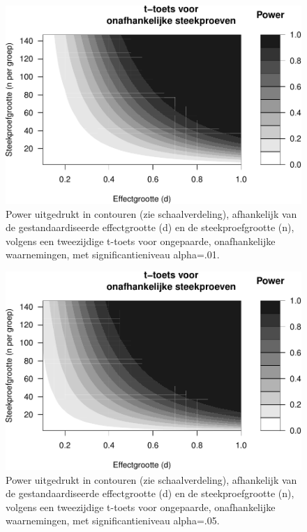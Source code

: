 \documentclass[
]{book}
\begin{document}
\begin{figure}
\centering
\includegraphics{KMS-NL_files/figure-latex/powercontours-alpha01-1.pdf}
\caption{\label{fig:powercontours-alpha01}Power uitgedrukt in contouren (zie schaalverdeling), afhankelijk van de gestandaardiseerde effectgrootte (d) en de steekproefgrootte (n), volgens een tweezijdige t-toets voor ongepaarde, onafhankelijke waarnemingen, met significantieniveau alpha=.01.}
\end{figure}

\begin{figure}
\centering
\includegraphics{KMS-NL_files/figure-latex/powercontours-alpha05-1.pdf}
\caption{\label{fig:powercontours-alpha05}Power uitgedrukt in contouren (zie schaalverdeling), afhankelijk van de gestandaardiseerde effectgrootte (d) en de steekproefgrootte (n), volgens een tweezijdige t-toets voor ongepaarde, onafhankelijke waarnemingen, met significantieniveau alpha=.05.}
\end{figure}
\end{document}
